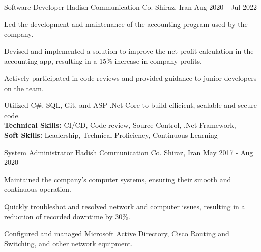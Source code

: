 

\begin{cventries}

    \cventry
    {Software Developer} %
    {Hadish Communication Co.} %
    {Shiraz, Iran} %
    {Aug 2020 - Jul 2022} %
    {
      \begin{cvitems} %
        \item {Led the development and maintenance of the accounting program used by the company.}
        \item {Devised and implemented a solution to improve the net profit calculation in the accounting app, resulting in a 15\% increase in company profits.}
        \item {Actively participated in code reviews and provided guidance to junior developers on the team.}
        \item {Utilized C\#, SQL, Git, and ASP .Net Core to build efficient, scalable and secure code.
        \\\textbf{Technical Skills:} CI/CD, Code review, Source Control, .Net Framework, 
        \\\textbf{Soft Skills:} Leadership, Technical Proficiency, Continuous Learning}%
      \end{cvitems}
    }%
    \cventry
    {System Administrator} %
    {Hadish Communication Co.} %
    {Shiraz, Iran} %
    {May 2017 - Aug 2020} %
    {
      \begin{cvitems} %
        \item {Maintained the company's computer systems, ensuring their smooth and continuous operation.}
        \item {Quickly troubleshot and resolved network and computer issues, resulting in a reduction of recorded downtime by 30\%.}
        \item {Configured and managed Microsoft Active Directory, Cisco Routing and Switching, and other network equipment.}

\end{cvitems}}
\end{cventries}
